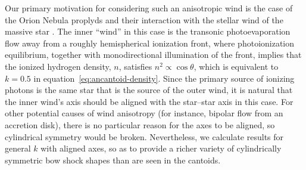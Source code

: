 Our primary motivation for considering such an anisotropic wind is the
case of the Orion Nebula proplyds and their interaction with the
stellar wind of the massive star \thC{}
\citep{Garcia-Arredondo:2001a}.  The inner ``wind'' in this case is
the transonic photoevaporation flow away from a roughly hemispherical
ionization front, where photoionization equilibrium, together with
monodirectional illumination of the front, implies that the ionized
hydrogen density, \(n\), satisfies \(n^2 \propto \cos \theta\), which is
equivalent to \(k = 0.5\) in equation~\eqref{eq:ancantoid-density}.
Since the primary source of ionizing photons is the same star that is
the source of the outer wind, it is natural that the inner wind's axis
should be aligned with the star--star axis in this case.  For other
potential causes of wind anisotropy (for instance, bipolar flow from
an accretion disk), there is no particular reason for the axes to be
aligned, so cylindrical symmetry would be broken.  Nevertheless, we
calculate results for general \(k\) with aligned axes, so as to
provide a richer variety of cylindrically symmetric bow shock shapes
than are seen in the cantoids.

